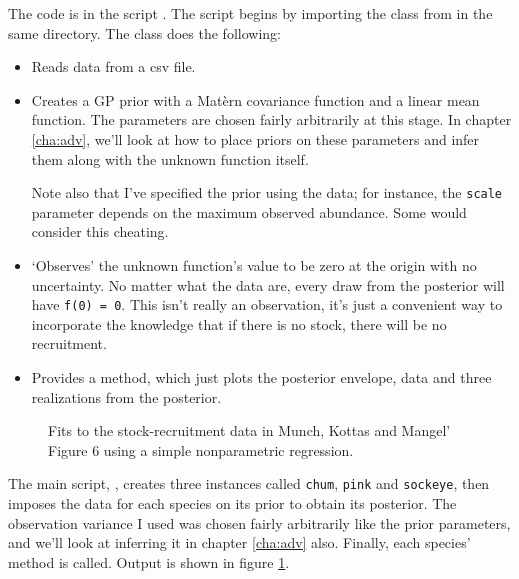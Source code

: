 \documentclass[]{manual}
\begin{document}
The code is in the script . The script begins by importing the  class from  in the same directory.
The  class does the following:
\begin{itemize}
    \item Reads data from a csv file.
    \item Creates a GP prior with a Mat\`ern covariance function and a linear mean function. The parameters are chosen fairly arbitrarily at this stage. In chapter \ref{cha:adv}, we'll look at how to place priors on these parameters and infer them along with the unknown function itself.

    Note also that I've specified the prior using the data; for instance, the \texttt{scale} parameter depends on the maximum observed abundance. Some would consider this cheating.
    \item `Observes' the unknown function's value to be zero at the origin with no uncertainty. No matter what the data are, every draw from the posterior will have \texttt{f(0) = 0}. This isn't really an observation, it's just a convenient way to incorporate the knowledge that if there is no stock, there will be no recruitment.
    \item Provides a  method, which just plots the posterior envelope, data and three realizations from the posterior.
\end{itemize}
% 

\begin{figure}
    \centering
    \caption{Fits to the stock-recruitment data in Munch, Kottas and Mangel' \cite{mmk} Figure 6 using a simple nonparametric regression.}
    \label{fig:MMKregression}
\end{figure}

The main script, , creates three  instances called \texttt{chum}, \texttt{pink} and \texttt{sockeye}, then imposes the data for each species on its prior to obtain its posterior. The observation variance I used was chosen fairly arbitrarily like the prior parameters, and we'll look at inferring it in chapter \ref{cha:adv} also. Finally, each species'  method is called. Output is shown in figure \ref{fig:MMKregression}.
% 
\end{document}
